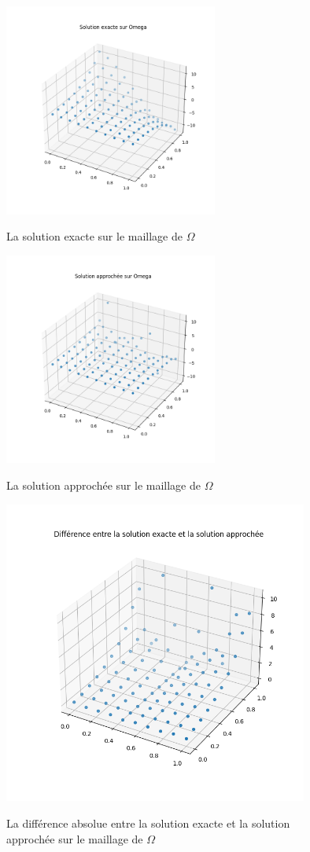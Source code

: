 \documentclass{article}
\begin{document}
\begin{figure}[h]
  \centering
  \includegraphics[width=7cm]{solex_omega.png}
  \label{fig/domaine}
  \caption{La solution exacte sur le maillage de $\Omega$}
\end{figure}

\vspace{1cm}

\begin{figure}[h]
  \centering
  \includegraphics[width=7cm]{solcalc_omega.png}
  \label{fig/domaine}
  \caption{La solution approchée sur le maillage de $\Omega$}
\end{figure}

\vspace{1cm}
\newpage
\begin{figure}[h]
  \centering
  \includegraphics[width=10cm]{diff_omega.png}
  \label{fig/domaine}
  \caption{La différence absolue entre la solution exacte et la solution approchée sur le maillage de $\Omega$}
\end{figure}
\end{document}
